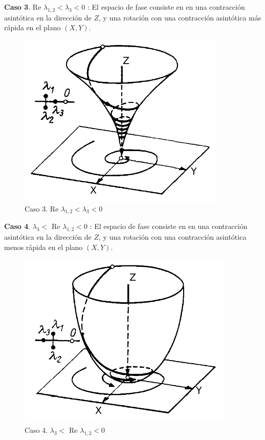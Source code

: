 \documentclass[a4paper,10pt]{article}
\begin{document}
\textbf{Caso 3}. Re $\lambda_{1,2} < \lambda_3 < 0$ : El espacio de fase consiste en en una contracción asintótica
en la dirección de $Z$, y una rotación con una contracción asintótica más rápida en el plano
$(X,Y)$.

\begin{figure}[H]
 \centering
\includegraphics[scale=0.35]{problema3fig4}
\caption{Caso 3. Re $\lambda_{1,2} < \lambda_3 < 0$}
\label{fig:problema3fig4}
\end{figure}
\vspace{.3cm}

\textbf{Caso 4}. $\lambda_3 <$ Re $\lambda_{1,2} < 0$ : El espacio de fase consiste en en una contracción asintótica
en la dirección de $Z$, y una rotación con una contracción asintótica menos rápida en el plano
$(X,Y)$.

\begin{figure}[H]
 \centering
\includegraphics[scale=0.35]{problema3fig5}
\caption{Caso 4. $\lambda_3 <$ Re $\lambda_{1,2} < 0$}
\label{fig:problema3fig5}
\end{figure}
\vspace{.3cm}
\end{document}

